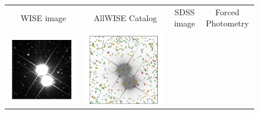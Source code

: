 \documentclass[12pt,preprint]{aastex}
\begin{document}
\begin{figure}
  \newlength{\figw}
  \setlength{\figw}{0.27\textwidth}
  \newcommand{\spc}{\hspace*{-0.03\textwidth}}
  \begin{center}
    \begin{tabular}{@{}c@{\spc}c@{\spc}c@{\spc}c@{}}
      WISE image & AllWISE Catalog & SDSS image & Forced Photometry \\
      \includegraphics[width=\figw]{bright-00} &
      \includegraphics[width=\figw]{bright-01} & %

\end{tabular}
\end{center}
\end{figure}
\end{document}
